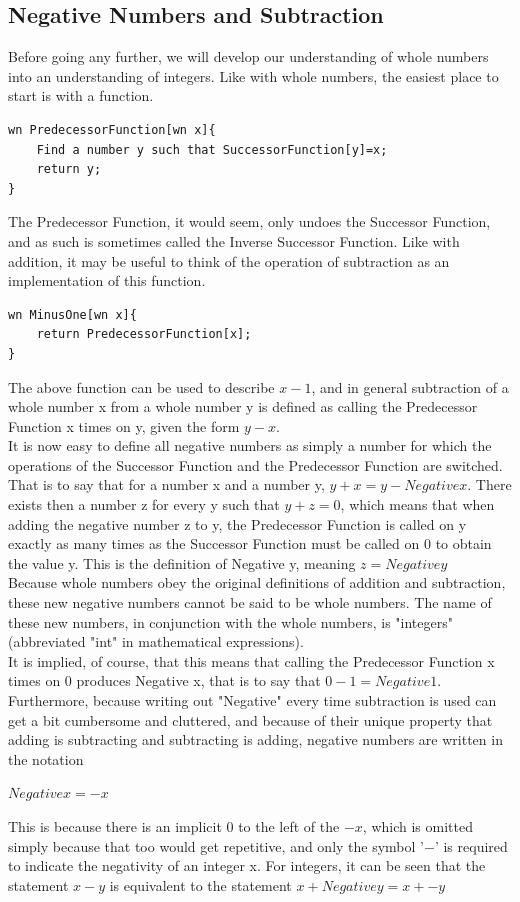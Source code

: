 \subsection{Negative Numbers and Subtraction}
Before going any further, we will develop our understanding of whole numbers into an understanding of integers. Like with whole numbers, the easiest place to start is with a function.
\begin{center}
\begin{verbatim}
wn PredecessorFunction[wn x]{
	Find a number y such that SuccessorFunction[y]=x;
	return y;
}
\end{verbatim}
\end{center}
The Predecessor Function, it would seem, only undoes the Successor Function, and as such is sometimes called the Inverse Successor Function. Like with addition, it may be useful to think of the operation of subtraction as an implementation of this function.
\begin{center}
\begin{verbatim}
wn MinusOne[wn x]{
	return PredecessorFunction[x];
}
\end{verbatim}
\end{center}
The above function can be used to describe $x-1$, and in general subtraction of a whole number x from a whole number y is defined as calling the Predecessor Function x times on y, given the form $y-x$. \\
It is now easy to define all negative numbers as simply a number for which the operations of the Successor Function and the Predecessor Function are switched. That is to say that for a number x and a number y, $y+x=y- Negative x$. There exists then a number z for every y such that $y+z=0$, which means that when adding the negative number z to y, the Predecessor Function is called on y exactly as many times as the Successor Function must be called on $0$ to obtain the value y. This is the definition of Negative y, meaning $z=Negative y$ \\
Because whole numbers obey the original definitions of addition and subtraction, these new negative numbers cannot be said to be whole numbers. The name of these new numbers, in conjunction with the whole numbers, is "integers" (abbreviated "int" in mathematical expressions). \\
It is implied, of course, that this means that calling the Predecessor Function x times on $0$ produces Negative x, that is to say that $0-1=Negative 1$. Furthermore, because writing out "Negative" every time subtraction is used can get a bit cumbersome and cluttered, and because of their unique property that adding is subtracting and subtracting is adding, negative numbers are written in the notation
\begin{center}
$Negative x = -x$
\end{center}
This is because there is an implicit $0$ to the left of the $-x$, which is omitted simply because that too would get repetitive, and only the symbol '$-$' is required to indicate the negativity of an integer x. For integers, it can be seen that the statement $x-y$ is equivalent to the statement $x+Negative y = x+ -y$

